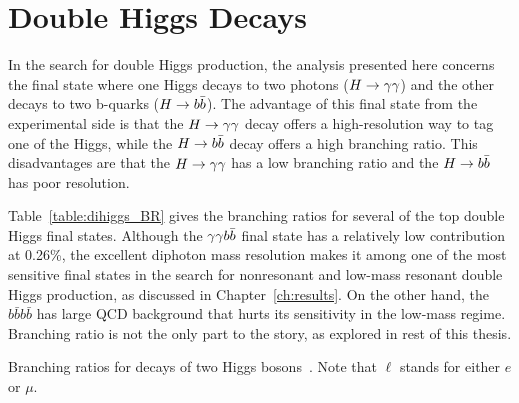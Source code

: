 

\section{Double Higgs Decays}

In the search for double Higgs production, the analysis presented here concerns the final state
where one Higgs decays to two photons ($H\to\gamma\gamma$) and the other decays to two b-quarks ($H\to b\bar{b}$).
The advantage of this final state from the experimental side is that the $H\to\gamma\gamma$ decay
offers a high-resolution way to tag one of the Higgs, while the $H\to b\bar{b}$ decay offers a high branching
ratio. This disadvantages are that the $H\to\gamma\gamma$ has a low branching ratio and the
$H\to b\bar{b}$ has poor resolution.

Table~\ref{table:dihiggs_BR} gives the branching ratios for several of the top double Higgs
final states. Although the $\gamma\gamma b\bar{b}$ final state has a relatively low contribution at 0.26\%,
the excellent
diphoton mass resolution makes it among one of the most sensitive final states in the search for
nonresonant and low-mass resonant double Higgs production, as discussed in Chapter~\ref{ch:results}.
On the other hand, the $b\bar{b} b\bar{b}$ has large QCD background that hurts its sensitivity
in the low-mass regime. Branching ratio is not the only part to the story, as explored in rest of
this thesis.

\begin{table}[ht]
  \centering
  \renewcommand{\arraystretch}{1.4}
  \caption{Branching ratios for decays of two Higgs bosons~\cite{LHC:SMHiggsBR}.
Note that $\ell$ stands for either $e$ or $\mu$.}
  
  \label{table:dihiggs_BR}
\end{table}

